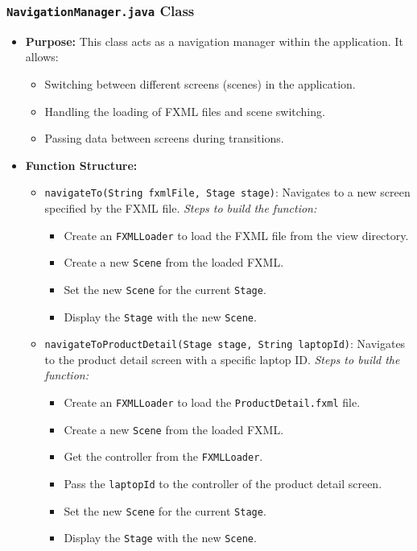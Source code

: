 \documentclass{article}
\begin{document}
\subsubsection{\texttt{NavigationManager.java} Class}
\begin{itemize}
    \item \textbf{Purpose:} This class acts as a navigation manager within the application. It allows:
    \begin{itemize}
        \item Switching between different screens (scenes) in the application.
        \item Handling the loading of FXML files and scene switching.
        \item Passing data between screens during transitions.
    \end{itemize}
    \item \textbf{Function Structure:}
    \begin{itemize}
        \item \texttt{navigateTo(String fxmlFile, Stage stage)}: Navigates to a new screen specified by the FXML file.
        \subitem \textit{Steps to build the function:}
        \begin{itemize}
            \item Create an \texttt{FXMLLoader} to load the FXML file from the view directory.
            \item Create a new \texttt{Scene} from the loaded FXML.
            \item Set the new \texttt{Scene} for the current \texttt{Stage}.
            \item Display the \texttt{Stage} with the new \texttt{Scene}.
        \end{itemize}
        \item \texttt{navigateToProductDetail(Stage stage, String laptopId)}: Navigates to the product detail screen with a specific laptop ID.
        \subitem \textit{Steps to build the function:}
        \begin{itemize}
            \item Create an \texttt{FXMLLoader} to load the \texttt{ProductDetail.fxml} file.
            \item Create a new \texttt{Scene} from the loaded FXML.
            \item Get the controller from the \texttt{FXMLLoader}.
            \item Pass the \texttt{laptopId} to the controller of the product detail screen.
            \item Set the new \texttt{Scene} for the current \texttt{Stage}.
            \item Display the \texttt{Stage} with the new \texttt{Scene}.
        \end{itemize}
    \end{itemize}
\end{itemize}
\end{document}
